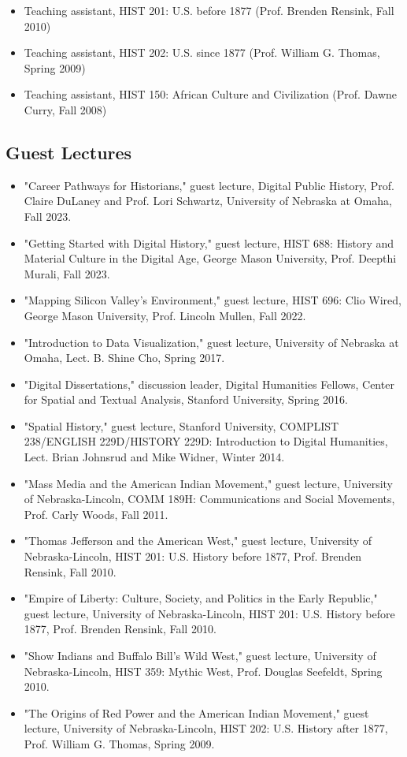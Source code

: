 \documentclass[10pt]{article}
\begin{document}
\begin{itemize}
  \item Teaching assistant, HIST 201: U.S. before 1877 (Prof. Brenden Rensink, Fall 2010)
  \item Teaching assistant, HIST 202: U.S. since 1877 (Prof. William G. Thomas, Spring 2009)
  \item Teaching assistant, HIST 150: African Culture and Civilization (Prof. Dawne Curry, Fall 2008)
\end{itemize}

\subsection*{Guest Lectures}

\begin{itemize}
  \item "Career Pathways for Historians," guest lecture, Digital Public History, Prof. Claire DuLaney and Prof. Lori Schwartz, University of Nebraska at Omaha, Fall 2023.
  \item "Getting Started with Digital History," guest lecture, HIST 688: History and Material Culture in the Digital Age, George Mason University, Prof. Deepthi Murali, Fall 2023.
  \item "Mapping Silicon Valley's Environment," guest lecture, HIST 696: Clio Wired, George Mason University, Prof. Lincoln Mullen, Fall 2022.
  \item "Introduction to Data Visualization," guest lecture, University of Nebraska at Omaha, Lect. B. Shine Cho, Spring 2017.
  \item "Digital Dissertations," discussion leader, Digital Humanities Fellows, Center for Spatial and Textual Analysis, Stanford University, Spring 2016.
  \item "Spatial History," guest lecture, Stanford University, COMPLIST 238/ENGLISH 229D/HISTORY 229D: Introduction to Digital Humanities, Lect. Brian Johnsrud and Mike Widner, Winter 2014.
  \item "Mass Media and the American Indian Movement," guest lecture, University of Nebraska-Lincoln, COMM 189H: Communications and Social Movements, Prof. Carly Woods, Fall 2011.
  \item "Thomas Jefferson and the American West," guest lecture, University of Nebraska-Lincoln, HIST 201: U.S. History before 1877, Prof. Brenden Rensink, Fall 2010.
  \item "Empire of Liberty: Culture, Society, and Politics in the Early Republic," guest lecture, University of Nebraska-Lincoln, HIST 201: U.S. History before 1877, Prof. Brenden Rensink, Fall 2010.
  \item "Show Indians and Buffalo Bill's Wild West," guest lecture, University of Nebraska-Lincoln, HIST 359: Mythic West, Prof. Douglas Seefeldt, Spring 2010.
  \item "The Origins of Red Power and the American Indian Movement," guest lecture, University of Nebraska-Lincoln, HIST 202: U.S. History after 1877, Prof. William G. Thomas, Spring 2009.
\end{itemize}
\end{document}

